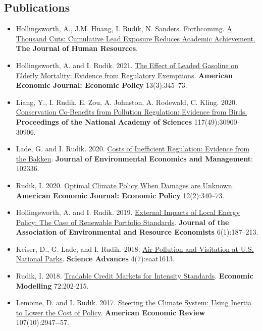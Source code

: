 \documentclass[11pt]{res} %
\begin{document}
\begin{resume}
\subsection{Publications}
\begin{itemize}
	\item[] Hollingsworth, A., J.M. Huang, I. Rudik, N. Sanders. Forthcoming. \href{https://www.nber.org/papers/w28250}{A Thousand Cuts: Cumulative Lead Exposure Reduces Academic Achievement.} \textbf{The Journal of Human Resources}.
	\item[] Hollingsworth, A. and I. Rudik. 2021. \href{https://osf.io/preprints/socarxiv/rdy6g}{The Effect of Leaded Gasoline on Elderly Mortality: Evidence from Regulatory Exemptions}. \textbf{American Economic Journal: Economic Policy} 13(3):345--73.
	\item[] Liang, Y., I. Rudik, E. Zou, A. Johnston, A. Rodewald, C. Kling. 2020. \href{https://www.pnas.org/content/early/2020/11/23/2013568117}{Conservation Co-Benefits from Pollution Regulation: Evidence from Birds.} \textbf{Proceedings of the National Academy of Sciences} 117(49):30900--30906.
	\item[] Lade, G. and I. Rudik. 2020. \href{https://papers.ssrn.com/sol3/papers.cfm?abstract_id=3086728}{Costs of Inefficient Regulation: Evidence from the Bakken}. \textbf{Journal of Environmental Economics and Management}: 102336.
	\item[] Rudik, I. 2020. \href{https://www.aeaweb.org/articles?id=10.1257/pol.20160541}{Optimal Climate Policy When Damages are Unknown}. \textbf{American Economic Journal: Economic Policy} 12(2):340--73.
	\item[] Hollingsworth, A. and I. Rudik. 2019. \href{http://papers.ssrn.com/sol3/papers.cfm?abstract_id=2697222}{External Impacts of Local Energy Policy: The Case of Renewable Portfolio Standards}. \textbf{Journal of the Association of Environmental and Resource Economists} 6(1):187--213.
	\item[] Keiser, D., G. Lade, and I. Rudik. 2018. \href{http://advances.sciencemag.org/content/4/7/eaat1613}{Air Pollution and Visitation at U.S. National Parks}. \textbf{Science Advances} 4(7):eaat1613.
	\item[] Rudik, I. 2018. \href{https://www.sciencedirect.com/science/article/pii/S0264999317315651}{Tradable Credit Markets for Intensity Standards}. \textbf{Economic Modelling} 72:202-215.
	\item[] Lemoine, D. and I. Rudik. 2017.  \href{http://papers.ssrn.com/sol3/papers.cfm?abstract_id=2443594}{Steering the Climate System: Using Inertia to Lower the Cost of Policy}. \textbf{American Economic Review} 107(10):2947‐-57.

\end{itemize}
\end{resume}
\end{document}
